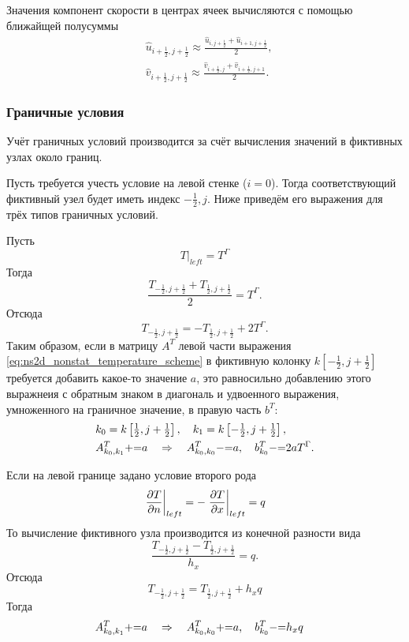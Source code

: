 Значения компонент скорости в центрах ячеек вычисляются с помощью ближайщей полусуммы
\begin{align*}
&\hat u_{i+\tfrac12, j+\tfrac12} \approx \frac{\hat u_{i, j+\tfrac12} + \hat u_{i+1, j+\tfrac12}}{2}, \\
&\hat v_{i+\tfrac12, j+\tfrac12} \approx \frac{\hat v_{i+\tfrac12, j} + \hat v_{i+\tfrac12, j+1}}{2}.
\end{align*}


\subsubsection{Граничные условия}

Учёт граничных условий производится за счёт вычисления значений в фиктивных узлах около границ.

Пусть требуется учесть условие на левой стенке ($i=0$).
Тогда соответствующий фиктивный узел будет иметь индекс $-\tfrac12, j$.
Ниже приведём его выражения для трёх типов граничных условий.

Пусть
\begin{equation}
\label{eq:ns2d_temperature_bc1}
\left. T\right|_{left} = T^{\Gamma}
\end{equation}
Тогда
$$
\frac{T_{-\tfrac12, j+\tfrac12} + T_{\tfrac12, j+\tfrac12}}{2} = T^{\Gamma}.
$$
Отсюда 
$$
T_{-\tfrac12, j+\tfrac12} = -T_{\tfrac12, j+\tfrac12} + 2 T^{\Gamma}.
$$
Таким образом, если в матрицу $A^T$ левой части выражения \cref{eq:ns2d_nonstat_temperature_scheme}
в фиктивную колонку $k\left[-\tfrac12, j+\tfrac12\right]$ требуется добавить
какое-то значение $a$, это равносильно добавлению этого выражнеия с обратным знаком в диагональ
и удвоенного выражения, умноженного на граничное значение, в правую часть $b^T$:
\begin{align}
\nonumber
&k_0 = k\left[\tfrac12, j + \tfrac12\right], \quad k_1 = k\left[-\tfrac12, j + \tfrac12\right], \\
\label{eq:ns2d_temperature_bc1_scheme}
&A^T_{k_0, k_1} {{+}{=}} a \quad\Rightarrow\quad
     A^T_{k_0, k_0} {{-}{=}} a, \quad b^T_{k_0} {{-}{=}} 2 a T^\Gamma.
\end{align}


Если на левой границе задано условие второго рода
\begin{equation}
\label{eq:ns2d_temperature_bc2}
\left.\frac{\partial T}{\partial n}\right|_{left} = -\left. \frac{\partial T}{\partial x} \right|_{left} = q
\end{equation}
То вычисление фиктивного узла производится из конечной разности вида
$$
\frac{T_{-\tfrac12, j+\tfrac12} - T_{\tfrac12, j+\tfrac12}}{h_x} = q.
$$
Отсюда 
$$
T_{-\tfrac12, j+\tfrac12} = T_{\tfrac12, j+\tfrac12} + h_x q
$$
Тогда
\begin{align}
\label{eq:ns2d_temperature_bc2_scheme}
&A^T_{k_0, k_1} {{+}{=}} a \quad\Rightarrow\quad
     A^T_{k_0, k_0} {{+}{=}} a, \quad b^T_{k_0} {{-}{=}} h_x q
\end{align}

